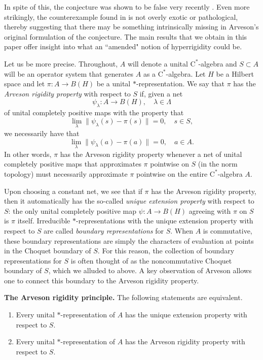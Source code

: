 \documentclass[10pt]{amsart}
\newcommand{\rC}{\mathrm{C}}
\theoremstyle{definition}
\begin{document}
In spite of this, the conjecture was shown to be false very recently \cite{bilich2024arveson}. Even more strikingly, the counterexample found in  \cite{bilich2024arveson} is not overly exotic or pathological, thereby suggesting that there may be something intrinsically missing in Arveson's original formulation of the conjecture. The main results  that we obtain in this paper offer  insight into what an ``amended" notion of hyperrigidity could be.

Let us be more precise. Throughout, $A$ will denote a unital $\rC^*$-algebra and $S\subset A$ will be an operator system that generates $A$ as a $\rC^*$-algebra. Let $H$ be a Hilbert space and let $\pi:A\to B(H)$ be a unital $*$-representation. We say that $\pi$ has the \emph{Arveson rigidity property} with respect to $S$ if, given a net 
\[
\psi_\lambda:A\to B(H),\quad \lambda\in \Lambda
\]
of unital completely positive maps with the property that 
\[
\lim_{\lambda} \|\psi_\lambda(s)-\pi(s)\|=0,\quad s\in S,
\]
we necessarily have that 
\[
\lim_{\lambda} \|\psi_\lambda(a)-\pi(a)\|=0,\quad a\in A.
\]
In other words, $\pi$ has the Arveson rigidity property whenever a net of unital completely positive maps that approximates $\pi$ pointwise on $S$ (in the norm topology) must necessarily approximate $\pi$ pointwise on the entire $\rC^*$-algebra $A$. 

Upon choosing a constant net, we see that if $\pi$ has the Arveson rigidity property, then it automatically has the so-called \emph{unique extension property} with respect to $S$: the only unital completely positive map $\psi:A\to B(H)$ agreeing with $\pi$ on $S$ is $\pi$ itself. Irreducible $*$-representations with the unique extension property with respect to $S$ are called \emph{boundary representations} for $S$. When $A$ is commutative, these boundary representations are simply the characters of evaluation at points in the Choquet boundary of $S$. For this reason, the collection of boundary representations for $S$ is often thought of as the noncommutative Choquet boundary of $S$, which we alluded to above.  A key observation of Arveson \cite[Theorem 2.1]{arveson2011noncommutative} allows one to connect this boundary to the Arveson rigidity property.

\vspace{3mm}

\noindent \textbf{The Arveson rigidity principle. }
The following statements are equivalent.
\begin{enumerate}[\rm (i)]
\item Every unital $*$-representation of $A$ has the unique extension property with respect to  $S$.
\item Every  unital $*$-representation of $A$ has  the Arveson rigidity property with respect to $S$.
\end{enumerate}
\end{document}
